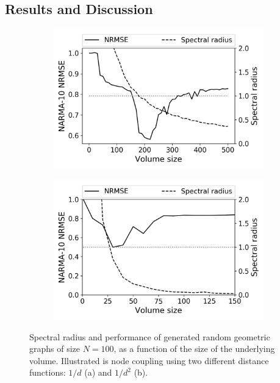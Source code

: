 \subsection{Results and Discussion}

\begin{figure}[t!]
  \centering
  \begin{subfigure}{.49\textwidth}
    \centering
    \includegraphics[width=1.0\linewidth]{figures/RGG-volume-size-inv.png}
    \caption{}
    \label{fig:size-graph-volume-a}
  \end{subfigure}
  \begin{subfigure}{.49\textwidth}
    \centering
    \includegraphics[width=1.0\linewidth]{figures/RGG-volume-size-inv-squared.png}
    \caption{}
    \label{fig:size-graph-volume-b}
  \end{subfigure}
  \caption{
    Spectral radius and performance of generated random geometric graphs of size
$N = 100$, as a function of the size of the underlying volume. Illustrated is
node coupling using two different distance functions: $1/d$ (a) and $1/d^2$ (b).
  }
  \label{fig:size-graph-volume}
\end{figure}

